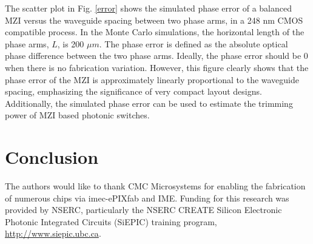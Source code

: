 \documentclass[journal]{spie}
\begin{document}
The scatter plot in Fig. \ref{error} shows the simulated phase error of a balanced MZI versus the waveguide spacing between two phase arms, in a 248 nm CMOS compatible process. In the Monte Carlo simulations, the horizontal length of the phase arms, $L$,  is 200 $\mu m$. The phase error is defined as the absolute optical phase difference between the two phase arms. Ideally, the phase error should be 0 when there is no fabrication variation. However, this figure clearly shows that the phase error of the MZI is approximately linearly proportional to the waveguide spacing, emphasizing the significance of very compact layout designs. Additionally, the simulated phase error can be used to estimate the trimming power of MZI based photonic switches. 



\section{Conclusion}\label{sec6}

%
%



\acknowledgments

The authors would like to thank CMC Microsystems for enabling the fabrication of numerous chips via imec-ePIXfab and IME.  Funding for this research was provided by NSERC, particularly the NSERC CREATE Silicon Electronic Photonic Integrated Circuits (SiEPIC) training program, \url{http://www.siepic.ubc.ca}.



\end{document}
